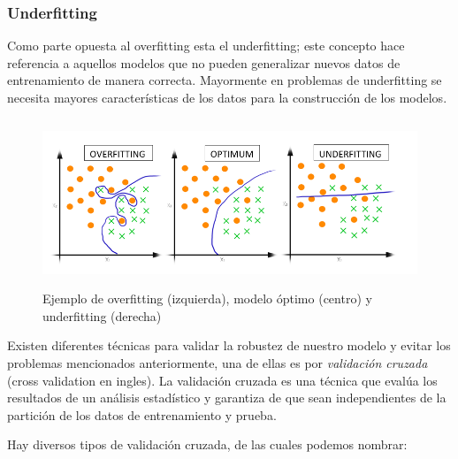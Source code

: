 \subsubsection*{Underfitting}
Como parte opuesta al overfitting esta el  underfitting; este concepto hace referencia a aquellos modelos que no pueden generalizar nuevos datos de entrenamiento de manera correcta. Mayormente en problemas de underfitting se necesita mayores características de los datos para la construcción de los modelos.

\begin{figure}[h]
 \centering
  \includegraphics[height=5cm,keepaspectratio=true,clip=true]{imagenes/Logos/OverFUnderF.png}
  \caption{Ejemplo de overfitting (izquierda), modelo óptimo (centro) y underfitting (derecha)}
	\label{Fig: overUnder}
\end{figure}


Existen diferentes técnicas para validar la robustez de nuestro modelo y evitar los problemas mencionados anteriormente, una de ellas es por  \textit{validación cruzada} (cross validation en ingles). La validación cruzada es una técnica que evalúa los resultados de un análisis estadístico y garantiza de que sean independientes de la partición de los datos de entrenamiento y prueba. 

Hay diversos tipos de validación cruzada, de las cuales podemos nombrar:

